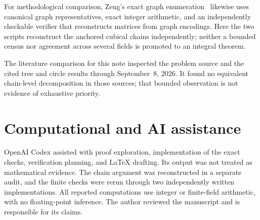 \documentclass[11pt]{article}
\begin{document}
For methodological comparison, Zeng's exact graph enumeration~\cite{zeng2026whiskered} likewise uses canonical graph representatives, exact integer arithmetic, and an independently checkable verifier that reconstructs matrices from graph encodings.  Here the two scripts reconstruct the anchored cubical chains independently; neither a bounded census nor agreement across several fields is promoted to an integral theorem.

The literature comparison for this note inspected the problem source and the cited tree and circle results through September~8, 2026.  It found no equivalent chain-level decomposition in those sources; that bounded observation is not evidence of exhaustive priority.

\section*{Computational and AI assistance}

OpenAI Codex assisted with proof exploration, implementation of the exact checks, verification planning, and LaTeX drafting.  Its output was not treated as mathematical evidence.  The chain argument was reconstructed in a separate audit, and the finite checks were rerun through two independently written implementations.  All reported computations use integer or finite-field arithmetic, with no floating-point inference.  The author reviewed the manuscript and is responsible for its claims.

\small


\end{document}
